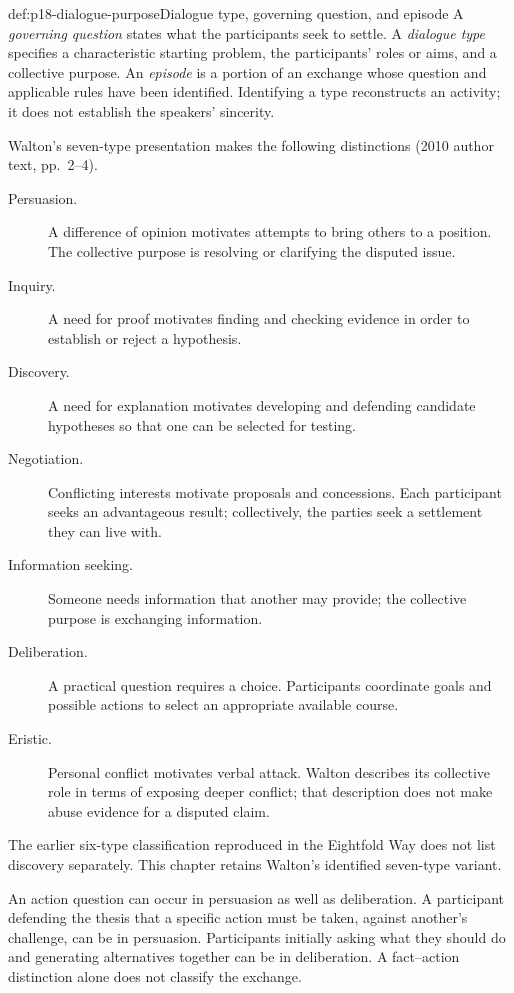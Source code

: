 \begin{hbdefinition}{def:p18-dialogue-purpose}{Dialogue type, governing question, and episode}
A \emph{governing question} states what the participants seek to settle.
A \emph{dialogue type} specifies a characteristic starting problem,
the participants' roles or aims, and a collective purpose.
An \emph{episode} is a portion of an exchange whose question and
applicable rules have been identified. Identifying a type reconstructs
an activity; it does not establish the speakers' sincerity.

Walton's seven-type presentation makes the following distinctions
(2010 author text, pp.~2--4).
\begin{description}
\item[Persuasion.] A difference of opinion motivates attempts to bring
others to a position. The collective purpose is resolving or clarifying
the disputed issue.
\item[Inquiry.] A need for proof motivates finding and checking evidence
in order to establish or reject a hypothesis.
\item[Discovery.] A need for explanation motivates developing and
defending candidate hypotheses so that one can be selected for testing.
\item[Negotiation.] Conflicting interests motivate proposals and
concessions. Each participant seeks an advantageous result; collectively,
the parties seek a settlement they can live with.
\item[Information seeking.] Someone needs information that another
may provide; the collective purpose is exchanging information.
\item[Deliberation.] A practical question requires a choice.
Participants coordinate goals and possible actions to select an
appropriate available course.
\item[Eristic.] Personal conflict motivates verbal attack. Walton
describes its collective role in terms of exposing deeper conflict;
that description does not make abuse evidence for a disputed claim.
\end{description}
The earlier six-type classification reproduced in the Eightfold Way
does not list discovery separately. This chapter retains Walton's
identified seven-type variant.
\end{hbdefinition}

An action question can occur in persuasion as well as deliberation.
A participant defending the thesis that a specific action must be taken,
against another's challenge, can be in persuasion. Participants initially
asking what they should do and generating alternatives together can be
in deliberation. A fact--action distinction alone does not classify
the exchange.

